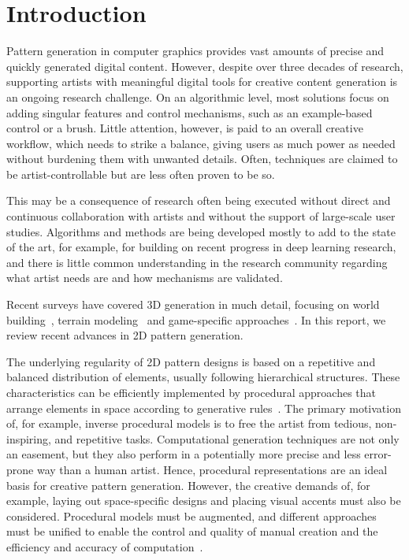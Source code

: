 \section{Introduction}
Pattern generation in computer graphics provides vast amounts of precise and quickly generated digital content. However, despite over three decades of research, supporting artists with meaningful digital tools for creative content generation is an ongoing research challenge. On an algorithmic level, most solutions focus on adding singular features and control mechanisms, such as an example-based control or a brush. Little attention, however, is paid to an overall creative workflow, which needs to strike a balance, giving users as much power as needed without burdening them with unwanted details. Often, techniques are claimed to be artist-controllable but are less often proven to be so.

This may be a consequence of research often being executed without direct and continuous collaboration with artists and without the support of large-scale user studies. Algorithms and methods are being developed mostly to add to the state of the art, for example, for building on recent progress in deep learning research, and there is little common understanding in the research community regarding what artist needs are and how mechanisms are validated.

Recent surveys have covered 3D generation in much detail, focusing on  world building~\cite{smelik_2014_aso, aliaga_2016_ipm}, terrain modeling~\cite{galin_2019_aro} and game-specific approaches~\cite{hendrikx_2013_pcg, togelius_2011_sbp}. In this report, we review recent advances in 2D pattern generation. 

The underlying regularity of 2D pattern designs is based on a repetitive and balanced distribution of elements, usually following hierarchical structures. These characteristics can be efficiently implemented by procedural approaches that arrange elements in space according to generative rules~\cite{stava_2010_ipm}. The primary motivation of, for example, inverse procedural models is to free the artist from tedious, non-inspiring, and repetitive tasks. Computational generation techniques are not only an easement, but they also perform in a potentially more precise and less error-prone way than a human artist. Hence, procedural representations are an ideal basis for creative pattern generation. However, the creative demands of, for example, laying out space-specific designs and placing visual accents must also be considered. Procedural models must be augmented, and different approaches must be unified to enable the control and quality of manual creation and the efficiency and accuracy of computation~\cite{gieseke_2017_ooo}. 

